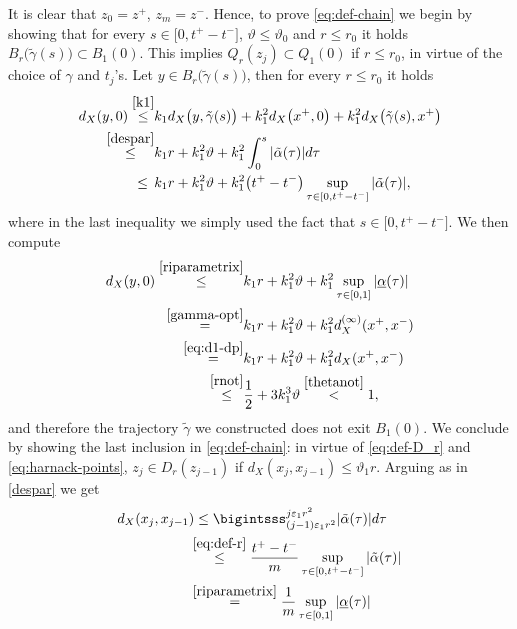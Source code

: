 \documentclass[11pt,a4paper]{article}
\numberwithin{equation}{section}
\def \tt {\tilde}
\def \a {{\alpha}}
\def \e {{\varepsilon}}
\def \t {{\tau}}
\begin{document}
{{It is clear that $z_0=z^+$, $z_m=z^-$. Hence, to prove \eqref{eq:def-chain} we begin by showing that for every $s\in \big[0,t^+-t^-\big]$, $\vartheta\leq \vartheta_0$ and $r\leq r_0$ it holds $B_r\big(\tt{\gamma}(s)\big)\subset B_1(0)$. This implies $Q_r(z_j) \subset Q_1(0)$ if $r\leq r_0$, in virtue of the choice of $\gamma$ and $t_j$'s. Let $y\in B_r\big(\tt{\gamma}(s)\big)$, then for every $r\leq r_0$ it holds
\begin{equation}
	\begin{aligned}
		d_X(y,0)\overset{\eqref{k1}}\leq& k_1 d_X\big(y,\tt{\gamma}(s)\big)+ k_1^2 d_X\big(x^+,0\big) + k_1^2d_X\big(\tt{\gamma}(s),x^+\big)\\
		\overset{\eqref{despar}}\leq & k_1 r+ k_1^2 \vartheta + k_1^2\int_{0}^{s}|\tt\a(\t)| d\t\\
		\leq\,\;&k_1 r+ k_1^2 \vartheta+ k^2_1\big(t^+-t^-\big) \sup_{\t\in[0,t^+-t^-]}|\tt\a(\t)|,
		\end{aligned}
\end{equation}
where in the last inequality we simply used the fact that $s\in \big[0,t^+-t^-\big]$. We then compute
\begin{equation}
	\begin{aligned}		
		d_X(y,0)\overset{\eqref{riparametrix}}\leq&k_1 r+ k_1^2 \vartheta+ k^2_1 \sup_{\t\in[0,1]}|\underline\a(\t)|
		\\
		\overset{\eqref{gamma-opt}}=&k_1 r+ k_1^2 \vartheta+ k^2_1 d_X^{(\infty)}(x^+,x^-)\\
		\overset{\eqref{eq:d1-dp}}=&k_1 r+ k_1^2 \vartheta+ k^2_1d_X(x^+,x^-)\\
		\overset{\eqref{rnot}}\leq &\frac{1}{2} +3k_1^3\vartheta\overset{\eqref{thetanot}}<1,
	\end{aligned}
\end{equation}
and therefore the trajectory $\tt \gamma$ we constructed does not exit $B_1(0)$. We conclude by showing the last inclusion in \eqref{eq:def-chain}: in virtue of \eqref{eq:def-D_r} and \eqref{eq:harnack-points}, $z_j \in D_r(z_{j-1})$ if $d_X(x_j,x_{j-1})\leq \vartheta_1 r$. Arguing as in \eqref{despar} we get
\begin{equation}
	\begin{aligned}
		d_X(x_j,x_{j-1})&\leq\bigintsss_{{(j-1)}\e_	1r^2}^{j\e_1r^2}|\tt \a(\t)| d\t\\
		&\!\!\!\!\;\overset{\eqref{eq:def-r}}\leq  \frac{t^+-t^-}{m} \sup_{\t\in[0,t^+-t^-]}|\tt \a(\t)| \\&\!\!\!\!\;\overset{\eqref{riparametrix}}=\frac{1}{m} \sup_{\t\in[0,1]}| \underline\a(\t) |		\\

\end{aligned}
\end{equation}}}
\end{document}
